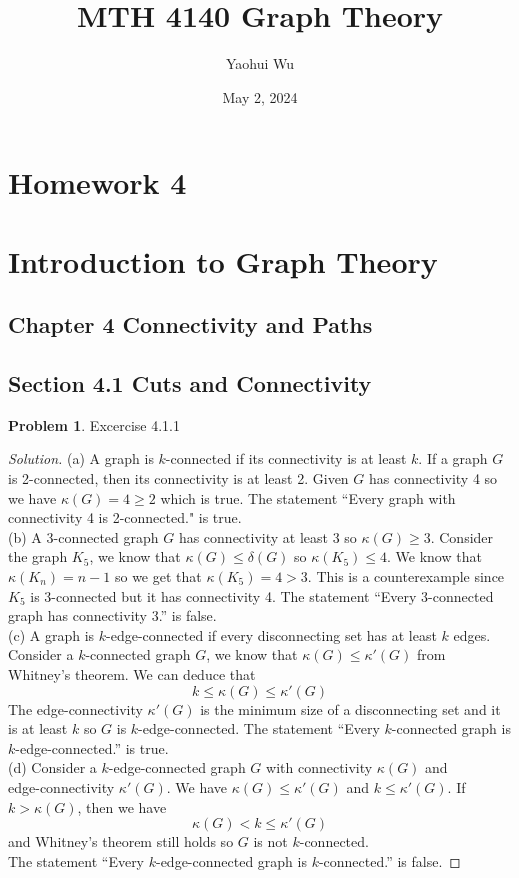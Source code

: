 \documentclass[12pt]{article}
\title{MTH 4140 Graph Theory}
\author{Yaohui Wu}
\date{May 2, 2024}
\theoremstyle{definition}
\newtheorem{problem}{Problem}
\newenvironment*{solution}{\begin{proof}[Solution]}{\end{proof}}
\begin{document}
\maketitle
\section*{Homework 4}
\section*{Introduction to Graph Theory}

\subsection*{Chapter 4 Connectivity and Paths}
\subsection*{Section 4.1 Cuts and Connectivity}

\begin{problem}
    Excercise 4.1.1
\end{problem}
\begin{solution}
    (a) A graph is \(k\)-connected if its connectivity is at least \(k\).
    If a graph \(G\) is 2-connected, then its connectivity is at least 2.
    Given \(G\) has connectivity 4 so we have \(\kappa(G)=4\geq2\) which is true.
    The statement ``Every graph with connectivity 4 is 2-connected." is true. \\
    (b) A 3-connected graph \(G\) has connectivity at least 3 so \(\kappa(G)\geq3\).
    Consider the graph \(K_5\), we know that \(\kappa(G)\leq\delta(G)\) so \(\kappa(K_5)\leq4\).
    We know that \(\kappa(K_n)=n-1\) so we get that \(\kappa(K_5)=4>3\).
    This is a counterexample since \(K_5\) is 3-connected but it has connectivity 4.
    The statement ``Every 3-connected graph has connectivity 3.'' is false. \\
    (c) A graph is \(k\)-edge-connected if every disconnecting set has at least \(k\) edges.
    Consider a \(k\)-connected graph \(G\), we know that \(\kappa(G)\leq\kappa'(G)\) from Whitney's theorem.
    We can deduce that \[k \leq \kappa(G) \leq \kappa'(G) \]
    The edge-connectivity \(\kappa'(G)\) is the minimum size of a disconnecting set and it is at least \(k\) so \(G\) is \(k\)-edge-connected.
    The statement ``Every \(k\)-connected graph is \(k\)-edge-connected.'' is true. \\
    (d) Consider a \(k\)-edge-connected graph \(G\) with connectivity \(\kappa(G)\) and \\ edge-connectivity \(\kappa'(G)\).
    We have \(\kappa(G)\leq\kappa'(G)\) and \(k\leq\kappa'(G)\).
    If \(k>\kappa(G)\), then we have \[\kappa(G)<k\leq\kappa'(G)\] and Whitney's theorem still holds so \(G\) is not \(k\)-connected. \\
    The statement ``Every \(k\)-edge-connected graph is \(k\)-connected.'' is false.
\end{solution}
\end{document}
